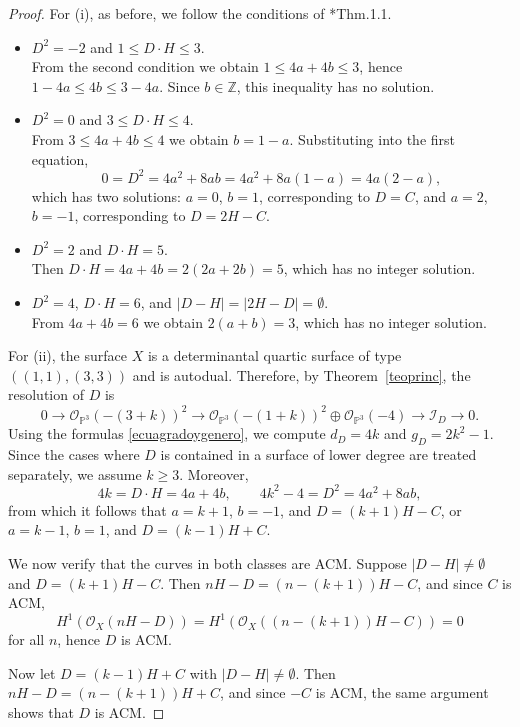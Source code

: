 \documentclass[12pt,reqno]{amsart}
\theoremstyle{plain}
\theoremstyle{definition}
\theoremstyle{remark}
\theoremstyle{definition}
\newcommand{\PP}{\mathds{P}}
\newcommand{\PPP}{\PP^{3}}
\newcommand{\ii}{\mathscr{I}}
\newcommand{\oo}{\mathcal{O}}
\begin{document}
\begin{proof}
For (i), as before, we follow the conditions of \cite{kwa}*{Thm.1.1}.

\begin{itemize}
    \item $D^{2}=-2$ and $1\leq D\cdot H\leq3$.\\
    From the second condition we obtain $1\leq4a+4b\leq3$, hence
    $1-4a\leq4b\leq3-4a$. Since $b\in\mathbb{Z}$, this inequality has no solution.

    \item $D^{2}=0$ and $3\leq D\cdot H\leq4$.\\
    From $3\leq4a+4b\leq4$ we obtain $b=1-a$.
    Substituting into the first equation,
    \[
    0=D^{2}=4a^{2}+8ab=4a^{2}+8a(1-a)=4a(2-a),
    \]
    which has two solutions: $a=0$, $b=1$, corresponding to $D=C$, and
    $a=2$, $b=-1$, corresponding to $D=2H-C$.

    \item $D^{2}=2$ and $D\cdot H=5$.\\
    Then $D\cdot H=4a+4b=2(2a+2b)=5$, which has no integer solution.

    \item $D^{2}=4$, $D\cdot H=6$, and $|D-H|=|2H-D|=\emptyset$.\\
    From $4a+4b=6$ we obtain $2(a+b)=3$, which has no integer solution.
\end{itemize}

For (ii), the surface $X$ is a determinantal quartic surface of type $((1,1),(3,3))$ and is autodual. Therefore, by Theorem~\ref{teoprinc}, the resolution of $D$ is
\[
0\to \oo_{\PPP}(-(3+k))^{2}
\to \oo_{\PPP}(-(1+k))^{2}\oplus \oo_{\PPP}(-4)
\to \ii_{D}\to 0.
\]
Using the formulas \eqref{ecuagradoygenero}, we compute
$d_{D}=4k$ and $g_{D}=2k^{2}-1$.
Since the cases where $D$ is contained in a surface of lower degree are treated separately, we assume $k\geq3$.
Moreover,
\[
4k=D\cdot H=4a+4b,\qquad
4k^{2}-4=D^{2}=4a^{2}+8ab,
\]
from which it follows that $a=k+1$, $b=-1$, and $D=(k+1)H-C$, or
$a=k-1$, $b=1$, and $D=(k-1)H+C$.

We now verify that the curves in both classes are ACM. Suppose $|D-H|\neq\emptyset$ and $D=(k+1)H-C$.
Then $nH-D=(n-(k+1))H-C$, and since $C$ is ACM,
\[
H^{1}(\oo_{X}(nH-D))=H^{1}(\oo_{X}((n-(k+1))H-C))=0
\]
for all $n$, hence $D$ is ACM.

Now let $D=(k-1)H+C$ with $|D-H|\neq\emptyset$.
Then $nH-D=(n-(k+1))H+C$, and since $-C$ is ACM, the same argument shows that $D$ is ACM.


\end{proof}
\end{document}
